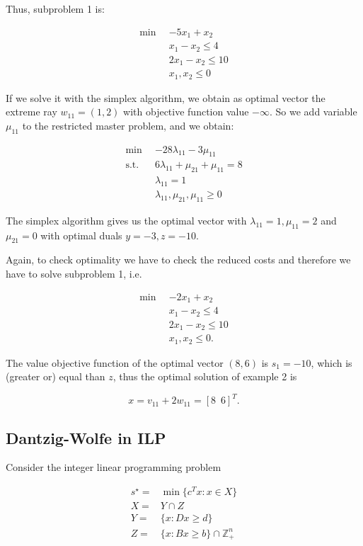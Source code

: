 \documentclass[a4paper,12pt]{article}
\begin{document}
Thus, subproblem 1 is:

\begin{align*}
\min \enspace & -5x_1 + x_2 \\
& x_1 - x_2 \leq 4 \\
& 2x_1 - x_2 \leq 10 \\
& x_1 , x_2 \leq 0
\end{align*}

If we solve it with the simplex algorithm, we obtain as optimal vector the extreme ray $w_{11}  = (1,2)$ with objective function value $-\infty$. So we add variable $\mu_{11}$ to the restricted master problem, and we obtain:

\begin{align*}
\min \enspace & -28\lambda_{11} -3\mu_{11} \\
\text{s.t.} \enspace & 6\lambda_{11} + \mu_{21} + \mu_{11} = 8 \\
& \lambda_{11} = 1 \\
&\lambda_{11} , \mu_{21} , \mu_{11} \geq 0
\end{align*}

The simplex algorithm gives us the optimal vector with $\lambda_{11} =  1, \mu_{11} = 2$ and $\mu_{21} = 0$ with optimal duals $y = -3, z = -10$.

Again, to check optimality we have to check the reduced costs and therefore we have to solve subproblem 1, i.e.

\begin{align*}
\min \enspace & -2x_1 + x_2 \\
& x_1 - x_2 \leq 4 \\
& 2x_1 - x_2 \leq 10 \\
& x_1 , x_2 \leq 0.
\end{align*}

The value objective function of the optimal vector $(8,6)$ is $s_1 = -10$, which is (greater or) equal than $z$, thus the optimal solution of example 2 is

\[
x = v_{11} + 2w_{11} = [8 \enspace 6]^T.
\]

\subsection{Dantzig-Wolfe in ILP}

Consider the integer linear programming problem

\begin{equation}
\begin{aligned}
s^\star =&\min \{c^Tx: x \in X\} \\
X =& Y \cap Z \\
Y =& \{x: Dx \geq d\} \\
Z =& \{x: Bx \geq b\} \cap \mathbb{Z}^n_+
\end{aligned}
\label{eq:ILPDantzig}
\end{equation}
\end{document}
